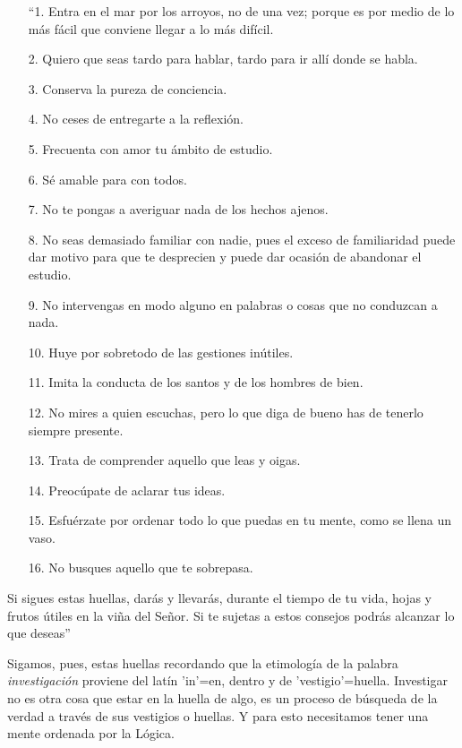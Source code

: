 \documentclass{article}
\begin{document}
\begin{enumerate}
    \item[``1.] Entra en el mar por los arroyos, no de una vez; porque es por medio de lo más fácil que conviene llegar a lo más difícil.
    \item[2.] Quiero que seas tardo para hablar, tardo para ir allí donde se habla.
    \item[3.] Conserva la pureza de conciencia.
    \item[4.] No ceses de entregarte a la reflexión.
    \item[5.] Frecuenta con amor tu ámbito de estudio.
    \item[6.] Sé amable para con todos.
    \item[7.] No te pongas a averiguar nada de los hechos ajenos.
    \item[8.] No seas demasiado familiar con nadie, pues el exceso de familiaridad puede dar motivo para que te desprecien y puede dar ocasión de abandonar el estudio.
    \item[9.] No intervengas en modo alguno en palabras o cosas que no conduzcan a nada.
    \item[10.] Huye por sobretodo de las gestiones inútiles.
    \item[11.] Imita la conducta de los santos y de los hombres de bien.
    \item[12.] No mires a quien escuchas, pero lo que diga de bueno has de tenerlo siempre presente.
    \item[13.] Trata de comprender aquello que leas y oigas.
    \item[14.] Preocúpate de aclarar tus ideas.
    \item[15.] Esfuérzate por ordenar todo lo que puedas en tu mente, como se llena un vaso.
    \item[16.] No busques aquello que te sobrepasa.
\end{enumerate}
    
    Si sigues estas huellas, darás y llevarás, durante el tiempo de tu vida, hojas y frutos útiles en la viña del Señor. Si te sujetas a estos consejos podrás alcanzar lo que deseas'' \par

    Sigamos, pues, estas huellas recordando que la etimología de la palabra \emph{investigación} proviene del latín 'in'=en, dentro y de 'vestigio'=huella. Investigar no es otra cosa que estar en la huella de algo, es un proceso de búsqueda de la verdad a través de sus vestigios o huellas. Y para esto necesitamos tener una mente ordenada por la Lógica. \par 
        
\end{document}
